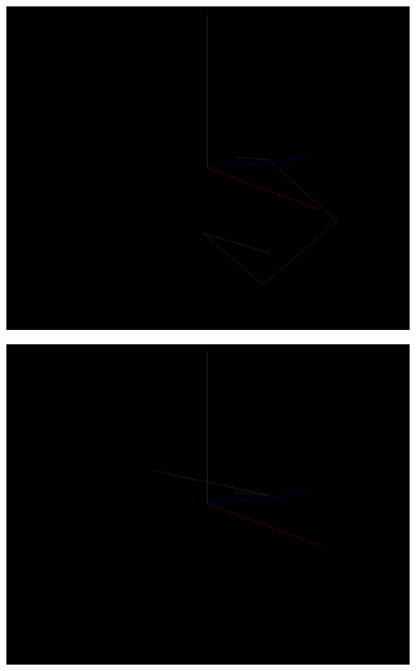 \documentclass[a4paper, 11pt]{article}
\begin{document}
            \begin{center}
                \includegraphics[width = \textwidth]{Animation1-3.PNG}
            \end{center}
            \begin{center}
                \includegraphics[width = \textwidth]{Animation1-4.PNG}
            \end{center}
\end{document}
